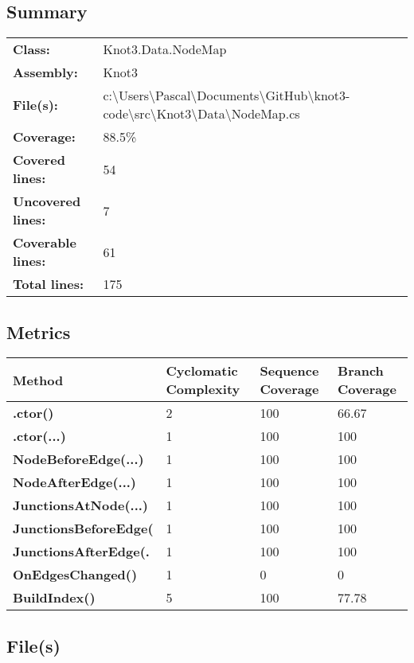 \documentclass[a4paper,10pt]{article}
\begin{document}
\subsection{Summary}
\begin{longtable}[l]{ll}
\textbf{Class:} & Knot3.Data.NodeMap\\
\textbf{Assembly:} & Knot3\\
\textbf{File(s):} & \begin{minipage}[t]{12cm}{c:\textbackslash Users\textbackslash Pascal\textbackslash Documents\textbackslash GitHub\textbackslash knot3-code\textbackslash src\textbackslash Knot3\textbackslash Data\textbackslash NodeMap.cs}\end{minipage} \\
\textbf{Coverage:} & 88.5\%\\
\textbf{Covered lines:} & 54\\
\textbf{Uncovered lines:} & 7\\
\textbf{Coverable lines:} & 61\\
\textbf{Total lines:} & 175\\
\end{longtable}
\subsection{Metrics}
\begin{longtable}[l]{|l|l|l|l|}
\hline
\textbf{Method} & \textbf{Cyclomatic Complexity} & \textbf{Sequence Coverage} & \textbf{Branch Coverage}\\
\hline
\textbf{.ctor()} & 2 & 100 & 66.67\\
\hline
\textbf{.ctor(...)} & 1 & 100 & 100\\
\hline
\textbf{NodeBeforeEdge(...)} & 1 & 100 & 100\\
\hline
\textbf{NodeAfterEdge(...)} & 1 & 100 & 100\\
\hline
\textbf{JunctionsAtNode(...)} & 1 & 100 & 100\\
\hline
\textbf{JunctionsBeforeEdge(} & 1 & 100 & 100\\
\hline
\textbf{JunctionsAfterEdge(.} & 1 & 100 & 100\\
\hline
\textbf{OnEdgesChanged()} & 1 & 0 & 0\\
\hline
\textbf{BuildIndex()} & 5 & 100 & 77.78\\
\hline
\end{longtable}
\subsection{File(s)}
\end{document}

